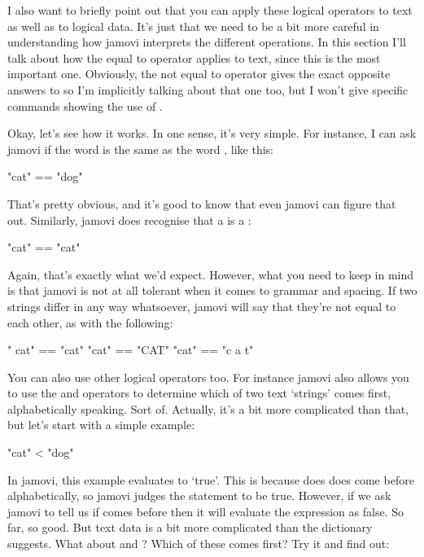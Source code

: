 
I also want to briefly point out that you can apply these logical operators to text as well as to logical data. It's just that we need to be a bit more careful in understanding how jamovi interprets the different operations. In this section I'll talk about how the equal to operator \rtext{==} applies to text, since this is the most important one. Obviously, the not equal to operator \rtext{!=} gives the exact opposite answers to \rtext{==} so I'm implicitly talking about that one too, but I won't give specific commands showing the use of \rtext{!=}. 

Okay, let's see how it works. In one sense, it's very simple. For instance, I can ask jamovi if the word  is the same as the word , like this:
\begin{rblock1}
"cat" == "dog"
\end{rblock1}
That's pretty obvious, and it's good to know that even jamovi can figure that out. Similarly, jamovi does recognise that a  is a :
\begin{rblock1}
"cat" == "cat"
\end{rblock1}
Again, that's exactly what we'd expect. However, what you need to keep in mind is that jamovi is not at all tolerant when it comes to grammar and spacing. If two strings differ in any way whatsoever, jamovi will say that they're not equal to each other, as with the following: 
\begin{rblock1}
" cat" == "cat"
"cat" == "CAT"
"cat" == "c a t"
\end{rblock1}
You can also use other logical operators too. For instance jamovi also allows you to use the \rtext{<} and \rtext{>} operators to determine which of two text `strings' comes first, alphabetically speaking. Sort of. Actually, it's a bit more complicated than that, but let's start with a simple example:
\begin{rblock1}
"cat" < "dog"
\end{rblock1}
In jamovi, this example evaluates to `true'. This is because  does does come before  alphabetically, so jamovi judges the statement to be true. However, if we ask jamovi to tell us if  comes before  then it will evaluate the expression as false. So far, so good. But text data is a bit more complicated than the dictionary suggests. What about  and ? Which of these comes first? Try it and find out:

